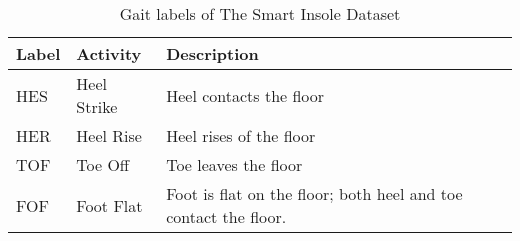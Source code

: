 \vspace{0.5cm} 

\begin{table} [ht!]
    \centering
    \begin{tabular}{|>{\centering}m{2.5cm} |>{\centering}m{2.5cm} |>{\centering}m{6.5cm} |}
        \hline
         \textbf{Label}   &  \textbf{Activity}   &  \textbf{Description}  \tabularnewline
        \hline
        HES	& Heel Strike & Heel contacts the floor \tabularnewline  
        \hline
        HER	& Heel Rise	& Heel rises of the floor \tabularnewline     
        \hline
        TOF	& Toe Off& Toe leaves the floor \tabularnewline
        \hline
        FOF	& Foot Flat & Foot is flat on the floor; both heel and toe contact the floor.\tabularnewline 
        \hline
    \end{tabular} 
    \caption{Gait labels of The Smart Insole Dataset}
    \label{tab:SmartInsoleGait}
\end{table}